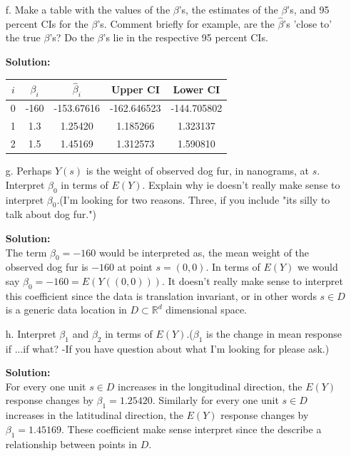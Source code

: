 \documentclass[12pt]{article}
\makeatletter
\theoremstyle{homework}
\newenvironment{exercise}[1]
{\def\@currentlabel{#1}\exercisecore}
{\endexercisecore}
\newcommand{\localhead}[1]{\par\smallskip\noindent\textbf{#1}\nobreak\\}%
\newcommand\solution{\localhead{Solution:}}
\newcommand{\Reals}{\ensuremath{\mathbb R}}
\let\RR\Reals
\makeatother
\begin{document}
\begin{exercise}{1}
\begin{enumerate}
  \item[f.] Make a table with the values of the $\beta$'s, the estimates of the $\beta$'s, and 
  95 percent CIs for the $\beta$'s. Comment briefly for example, are the $\hat\beta$'s 'close to' the true $\beta$'s?
  Do the $\beta$'s lie in the respective 95 percent CIs.\\
  \solution 
  \begin{center}
  \begin{tabular}{|c||c|c|c|c| }
    \hline
    $i$ & $\beta_i$ & $\hat{\beta}_i$ & Upper CI & Lower CI\\
    \hline 
    \hline
    0& -160 & -153.67616 & -162.646523&   -144.705802\\
    1& 1.3  & 1.25420    & 1.185266   &   1.323137\\
    2& 1.5  & 1.45169    & 1.312573   &   1.590810\\
    \hline
   \end{tabular}
  \end{center}

  \vspace{.15in} 








  \item[g.] Perhaps $Y(s)$ is the weight of observed dog fur, in nanograms, at $s$. Interpret $\beta_0$ in terms 
  of $E(Y)$. Explain why ie doesn't really make sense to interpret $\beta_0$.(I'm looking for two reasons. Three, if you include "its silly to talk about dog fur.")\\
  \solution The term $\beta_0 = -160$ would be interpreted as, the mean weight of the observed dog fur is $-160$ at point $s = (0,0)$. In terms of $E(Y)$ we would say
  $\beta_0 = -160 = E(Y((0,0)))$. It doesn't really make sense to interpret this coefficient since the data is translation invariant, or in other words $s \in D$ is a generic data 
  location in $D \subset \RR^d$ dimensional space.
  \vspace{.15in} 








  \item[h.] Interpret $\beta_1$ and $\beta_2$ in terms of $E(Y)$.($\beta_1$ is the change in mean response if  ...if what? -If you have question about what I'm looking for 
  please ask.)\\ 
  \solution For every one unit $s \in D$ increases in the longitudinal direction, the $E(Y)$ response changes by 
  $\beta_1 = 1.25420$. Similarly for every one unit $s \in D$ increases in the latitudinal direction, the $E(Y)$ response changes by 
  $\beta_1 = 1.45169$. These coefficient make sense interpret since the describe a relationship between points in $D$.
\end{enumerate}
\end{exercise}
\vspace{.5in} 
\end{document}
